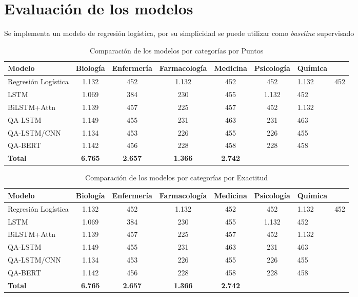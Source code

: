 \section{Evaluación de los modelos}

Se implementa un modelo de regresión logística, por su simplicidad se puede utilizar como \textit{baseline} supervisado 



\begin{table}[!tb]
  \begin{center}
    \caption{Comparación de los modelos por categorías por Puntos}
    \begin{tabular}{l|c|c|c|c|c}
      \textbf{Modelo} & \textbf{Biología} & \textbf{Enfermería} & \textbf{Farmacología} & \textbf{Medicina} & \textbf{Psicología} & \textbf{Química}\\
      \hline
      Regresión Logística & 1.132 & 452 & 1.132 & 452 & 452 & 1.132 & 452\\
      LSTM & 1.069 & 384 & 230 & 455 & 1.132 & 452 \\
      BiLSTM+Attn & 1.139 & 457 & 225 & 457 & 452 & 1.132 \\
      QA-LSTM & 1.149 & 455 & 231 & 463 & 231 & 463 \\
      QA-LSTM/CNN & 1.134 & 453 & 226 & 455 & 226 & 455 \\
      QA-BERT & 1.142 & 456 & 228 & 458 & 228 & 458 \\ 
      \textbf{Total} & \textbf{6.765} & \textbf{2.657} & \textbf{1.366} & \textbf{2.742}\\
    \end{tabular}
  \end{center}
  \label{comparison_points}
\end{table}


\begin{table}[!tb]
  \begin{center}
    \caption{Comparación de los modelos por categorías por Exactitud}
    \begin{tabular}{l|c|c|c|c|c}
      \textbf{Modelo} & \textbf{Biología} & \textbf{Enfermería} & \textbf{Farmacología} & \textbf{Medicina} & \textbf{Psicología} & \textbf{Química}\\
      \hline
      Regresión Logística & 1.132 & 452 & 1.132 & 452 & 452 & 1.132 & 452\\
      LSTM & 1.069 & 384 & 230 & 455 & 1.132 & 452 \\
      BiLSTM+Attn & 1.139 & 457 & 225 & 457 & 452 & 1.132 \\
      QA-LSTM & 1.149 & 455 & 231 & 463 & 231 & 463 \\
      QA-LSTM/CNN & 1.134 & 453 & 226 & 455 & 226 & 455 \\
      QA-BERT & 1.142 & 456 & 228 & 458 & 228 & 458 \\ 
      \textbf{Total} & \textbf{6.765} & \textbf{2.657} & \textbf{1.366} & \textbf{2.742}\\
    \end{tabular}
  \end{center}
  \label{comparison_acuracy}
\end{table}




